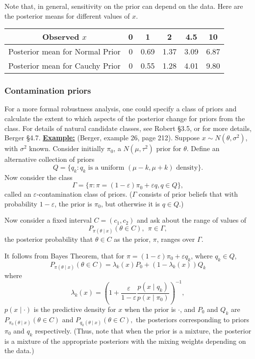 \documentclass[12pt]{article}
\def\ni{\noindent}
\begin{document}
Note that, in general, sensitivity on the prior can depend on the data. Here are the posterior means
for different values of $x$.
\begin{center}
\begin{tabular}{|c|c|c|c|c|c|}\hline
Observed $x$ & 0 & 1 & 2 & 4.5 & 10 \\ \hline \hline
Posterior mean for Normal Prior & 0 & 0.69 & 1.37 & 3.09 & 6.87 \\ \hline
Posterior mean for Cauchy Prior & 0 & 0.55 & 1.28 & 4.01 & 9.80 \\ \hline
\end{tabular}
\end{center}

\subsubsection{Contamination priors}

For a more formal robustness analysis, one could specify a class of
priors and calculate the extent to which aspects of the posterior
change for priors from the class.  For details of natural candidate
classes, see Robert \S3.5, or for more details, Berger \S4.7.
\vskip 4mm
\ni\underline{\bf Example:}  (Berger, example 26, page 212).  Suppose
$x\sim N(\theta,\sigma^2)$, with $\sigma^2$ known.  Consider initially
$\pi_0$, a $N(\mu,\tau^2)$ prior for $\theta$.  Define an alternative
collection of priors
$$
Q=\{ q_k: q_k \mbox{ is a uniform } (\mu-k,\mu+k)
\mbox{ density}\}.
$$  Now consider the class
$$\Gamma=\{\pi :\pi=(1-\varepsilon)\pi_0 + \varepsilon q, q\in Q\},
$$
called an $\varepsilon$-contamination class of priors.  ($\Gamma$
consists of prior beliefs that with probability $1-\varepsilon$, the
prior is $\pi_0$, but otherwise it is $q\in Q$.)

Now consider a fixed
interval $C=(c_1,c_2)$ and ask about the range of values of
$$P_{\pi(\theta \mid x)} (\theta \in C),\ \ \pi \in \Gamma,
$$
the posterior probability that $\theta \in C$ as the prior, $\pi$,
ranges over $\Gamma$.

It follows from Bayes Theorem, that for
$\pi=(1-\varepsilon)\pi_0 + \varepsilon q_k$, where $q_k \in Q$,
$$P_{\pi(\theta \mid x)} (\theta \in C)=\lambda_k (x) P_0 +
(1-\lambda_k (x)) Q_k$$
where 
$$\lambda_k(x)=\left( 1+ \frac{\varepsilon}{1-\varepsilon} \frac{p(x
    \mid q_k)}{p(x \mid \pi_0)} \right)^{-1},$$
$p(x\mid \cdot)$
is the predictive density for $x$ when the prior is $\cdot$, and $P_0$
and $Q_k$ are 
$P_{\pi_0 (\theta \mid x)} (\theta \in C)$ and $P_{q_k (\theta \mid x)}
(\theta \in C),$
the posteriors corresponding to priors $\pi_0$ and $q_k$ respectively.
(Thus, note that when the prior is a mixture, the posterior is a
mixture of the appropriate posteriors with the mixing weights
depending on the data.)
\end{document}
